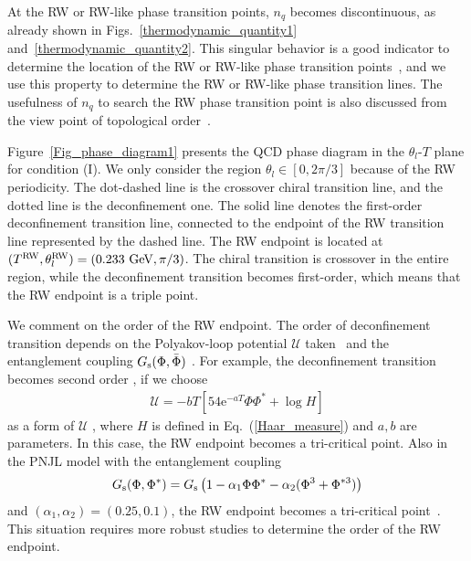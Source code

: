 \documentclass[prd,superscriptaddress,unsortedaddress,
twocolumn,showpacs,preprintnumbers,amsmath,amssymb]{revtex4}
\begin{document}
  At the RW or RW-like phase transition points,
  $n_{q}$ becomes discontinuous,
  as already shown in Figs.~\ref{thermodynamic_quantity1}
  and~\ref{thermodynamic_quantity2}.
  This singular behavior is a good indicator to determine the
  location of the RW or RW-like phase transition points~\cite{Kouno_JPhys},
  and we use this property to determine the RW
  or RW-like phase transition lines.
  The usefulness of $n_{q}$ to search the RW phase transition point
  is also discussed from the view point of topological order~\cite{Kashiwa_holonomy}.

  Figure~\ref{Fig_phase_diagram1} presents
  the QCD phase diagram in the $\theta_{l}$-$T$ plane
  for condition (I).
  We only consider the region $\theta_{l}\in[0,2\pi/3]$
  because of the RW periodicity.
  The dot-dashed line is the crossover chiral transition line,
  and the dotted line is the deconfinement one.
  The solid line denotes the first-order deconfinement transition line,
  connected to the endpoint of the RW transition line
  represented by the dashed line.
  The RW endpoint is located at
  $(T^{\rm RW},\theta^{\rm RW}_{l})=(0.233\ \textrm{GeV}, \pi/3)$. 
  The chiral transition is crossover in the entire region,
  while the deconfinement transition becomes first-order,
  which means that the RW endpoint is a triple point.
  
  We comment on the order of the RW endpoint.
  The order of deconfinement transition depends on
  the Polyakov-loop potential $\mathcal{U}$
  taken~\cite{Kouno_JPhys, Sakai_JPhys} and
  the entanglement coupling $G_{\rm s}(\Phi,\bar{\Phi})$
  \cite{Sasaki_EPNJL,Sakai_EPNJL,Sakai_Sasaki_JPhys}.
  For example, the deconfinement transition becomes
  second order \cite{Kouno_JPhys, Sakai_JPhys},
  if we choose
  \begin{eqnarray}
   \mathcal{U}=-bT\left[
                   54\textrm{e}^{-aT}\Phi\Phi^{\ast}+
                   \log H
                  \right]
  \end{eqnarray}
  as a form of $\mathcal{U}$
  \cite{Fukushima1}, where $H$ is defined in Eq.~(\ref{Haar_measure})
  and $a, b$ are parameters.
  In this case, the RW endpoint becomes a
  tri-critical point.
  Also in the PNJL model with the entanglement coupling
  \begin{eqnarray}
   G_{\rm s}(\Phi,\Phi^{\ast})=G_{\rm s}
    \left(1-\alpha_{1}\Phi\Phi^{\ast}-\alpha_{2}(\Phi^3
     +\Phi^{\ast 3})\right)
  \end{eqnarray}
  and $(\alpha_{1}, \alpha_{2})=(0.25, 0.1)$,
  the RW endpoint becomes a tri-critical point~\cite{Sasaki_EPNJL}.
  This situation requires more robust studies to determine the order of
  the RW endpoint.
\end{document}
